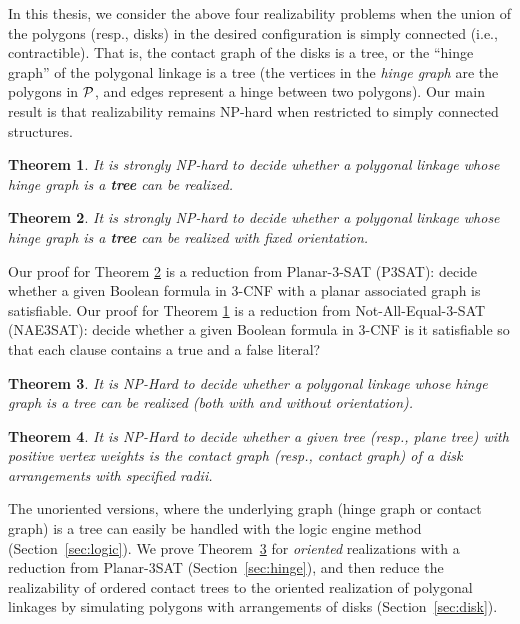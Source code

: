 \documentclass[10pt]{CSUNthesis}
\theoremstyle{plain}%
\newtheorem{thm}{Theorem}
\theoremstyle{definition}
\theoremstyle{remark}
\renewcommand{\PP}{{\cal P}} %
\begin{document}
In this thesis, we consider the above four realizability problems when the union of the polygons 
(resp., disks) in the desired configuration is simply connected (i.e., contractible). That is, the 
contact graph of the disks is a tree, or the ``hinge graph'' of the polygonal linkage is a tree (the 
vertices in the \emph{hinge graph} are the polygons in $\PP$, and edges represent a hinge between 
two polygons). Our main result is that realizability remains NP-hard when restricted to simply 
connected structures.
 
\begin{thm}\label{thm:hinge2}
It is strongly NP-hard to decide whether a polygonal linkage whose hinge graph is a \textbf{tree} can be realized.
\end{thm}
\begin{thm}\label{thm:hinge3}
It is strongly NP-hard to decide whether a polygonal linkage whose hinge graph is a \textbf{tree} can be realized with fixed orientation.
\end{thm}
Our proof for Theorem \ref{thm:hinge3} is a reduction from {\sc Planar-3-SAT} (P3SAT): decide whether a given Boolean formula in 3-CNF with a planar associated graph is satisfiable. 
Our proof for Theorem \ref{thm:hinge2} is a reduction from {\sc Not-All-Equal-3-SAT} (NAE3SAT): decide whether a given Boolean formula in 3-CNF  is it satisfiable so that each clause contains a true and a false literal?


\begin{thm}\label{thm:hinge}
It is NP-Hard to decide whether a polygonal linkage whose hinge graph is a tree can be realized 
(both with and without orientation).
\end{thm}

\begin{thm}\label{thm:disk}
It is NP-Hard to decide whether a given tree (resp., plane tree) with positive vertex weights
is the contact graph (resp., contact graph) of a disk arrangements with specified radii.
\end{thm}

The unoriented versions, where the underlying graph (hinge graph or contact graph) is a tree can 
easily be handled with the logic engine method (Section~\ref{sec:logic}). We prove 
Theorem~\ref{thm:hinge} for \emph{oriented} realizations with a reduction from {\sc Planar-3SAT} 
(Section~\ref{sec:hinge}), and then reduce the realizability of ordered contact trees to the 
oriented realization of polygonal linkages by simulating polygons with arrangements of disks 
(Section~\ref{sec:disk}).
\end{document}

